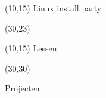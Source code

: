 \documentclass[11pt,a4paper]{beamer}
\begin{document}
\begin{frame}

  \begin{textblock}{60}(10,15)
    {\huge Linux install party}
  \end{textblock}

  \begin{textblock}{20}(30,23)
  \end{textblock}
\end{frame}

\begin{frame}

  \begin{textblock}{60}(10,15)
    {\huge Lessen}
  \end{textblock}

  \begin{textblock}{20}(30,30)
  \end{textblock}
\end{frame}


\begin{frame}
  \begin{center}
    {\Huge Projecten}
  \end{center}
\end{frame}
\end{document}
